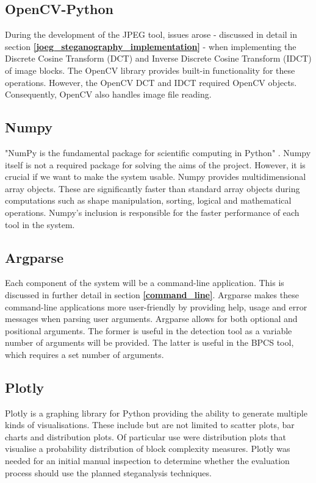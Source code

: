 \documentclass{l4proj}
\begin{document}
\subsection{OpenCV-Python}\label{opencv}

During the development of the JPEG tool, issues arose -  discussed in detail in section \textbf{\ref{joeg_steganography_implementation}} - when implementing the Discrete Cosine Transform (DCT) and Inverse Discrete Cosine Transform (IDCT) of image blocks. The OpenCV \citep{opencv} library provides built-in functionality for these operations. However, the OpenCV DCT and IDCT required OpenCV objects. Consequently, OpenCV also handles image file reading.

\subsection{Numpy}

"NumPy is the fundamental package for scientific computing in Python" \citep{numpy}. Numpy itself is not a required package for solving the aims of the project. However, it is crucial if we want to make the system usable. Numpy provides multidimensional array objects. These are significantly faster than standard array objects during computations such as shape manipulation, sorting, logical and mathematical operations. Numpy's inclusion is responsible for the faster performance of each tool in the system.

\subsection{Argparse}\label{argparse}

Each component of the system will be a command-line application. This is discussed in further detail in section \textbf{\ref{command_line}}. Argparse \citep{argparse} makes these command-line applications more user-friendly by providing help, usage and error messages when parsing user arguments. Argparse allows for both optional and positional arguments. The former is useful in the detection tool as a variable number of arguments will be provided. The latter is useful in the BPCS tool, which requires a set number of arguments.

\subsection{Plotly}

Plotly \citep{plotly} is a graphing library for Python providing the ability to generate multiple kinds of visualisations.  These include but are not limited to scatter plots, bar charts and distribution plots. Of particular use were distribution plots that visualise a probability distribution of block complexity measures. Plotly was needed for an initial manual inspection to determine whether the evaluation process should use the planned steganalysis techniques.
\end{document}
